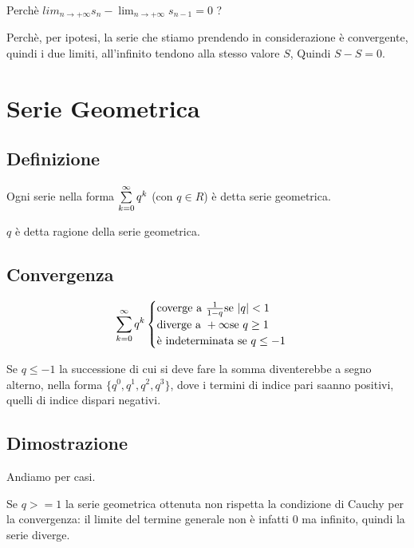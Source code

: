 \begin{tip}
Perchè $lim_{n \to +\infty} s_n - \lim_{n \to +\infty} s_{n-1} = 0$ ?

Perchè, per ipotesi, la serie che stiamo prendendo in considerazione è convergente, quindi i due limiti, all'infinito tendono alla stesso valore $S$, Quindi $S-S = 0$. 
\end{tip}

\section{Serie Geometrica}

\subsection{Definizione}
Ogni serie nella forma $\sum\limits_{k=0}^{\infty}q^k$ (con $q \in R$) è detta serie geometrica.

$q$ è detta ragione della serie geometrica.

\subsection{Convergenza}
$$\sum\limits_{k=0}^{\infty}q^k 
\begin{cases}
\text{coverge a } \frac{1}{1-q} \text{se } |q|<1 \\
\text{diverge a } +\infty \text{se } q \geq 1 \\
\text{è indeterminata se } q \leq -1 \\
\end{cases} $$

\begin{tip}
Se $q \leq -1$ la successione di cui si deve fare la somma diventerebbe a segno alterno, nella forma $\{q^0,q^1,q^2,q^3\}$, dove i termini di indice pari saanno positivi, quelli di indice dispari negativi. 
\end{tip}

\subsection{Dimostrazione}

Andiamo per casi.


Se $q>=1$ la serie geometrica ottenuta non rispetta la condizione di Cauchy per la convergenza: il limite del termine generale non è infatti 0 ma infinito, quindi la serie diverge.

